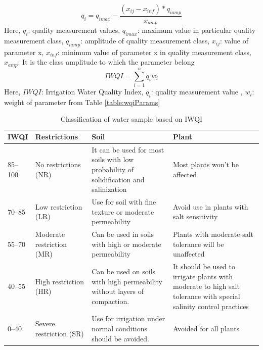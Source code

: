 \begin{equation}
\label{equation:calcQ}
    q_i = q_{imax} - \frac{(x_{ij} - x_{inf})*q_{iamp}}{x_{amp}}
\end{equation} 
Here, \newline
$q_i$: quality measurement values, \newline
$q_{imax}$: maximum value in particular quality measurement class, \newline	
$q_{iamp}$: amplitude of quality measurement class, \newline
$x_{ij}$: value of parameter x, \newline
$x_{inf}$: minimum value of parameter x in quality measurement class, \newline
$x_{amp}$: It is the class amplitude to which the parameter belong 	
\begin{equation}
\label{equation:calcWQI}
    IWQI = \sum_{i=1}^{n}q_iw_i
\end{equation}
Here, \newline
$IWQI$: Irrigation Water Quality Index, \newline
$q_i$: quality measurement value , \newline
$w_i$: weight of parameter from Table \ref{table:wqiParams}

\begin{table}[h!]
    \centering
    \begin{tabular}{| m{} | m{}| m{} | m{} |}
    \hline
        IWQI & Restrictions & Soil & Plant \\ \hline
        85–100 & No restrictions (NR) & It can be used for most soils with low probability of solidification and salinization & Most plants won’t be affected \\ \hline
        70–85 & Low restriction (LR) & Use for soil with fine texture or moderate permeability & Avoid use in plants with salt sensitivity \\ \hline
        55–70 & Moderate restriction (MR) & Can be used in soils with high or moderate permeability & Plants with moderate salt tolerance will be unaffected \\ \hline
        40–55 & High restriction (HR) & Can be used on soils with high permeability without layers of compaction. & It should be used to irrigate plants with moderate to high salt tolerance with special salinity control practices \\ \hline
        0–40 & Severe restriction (SR) & Use for irrigation under normal conditions should be avoided. & Avoided for all plants \\ \hline
    \end{tabular}
    \caption{Classification of water sample based on IWQI}
    \label{table:classifyWQI}
\end{table}

